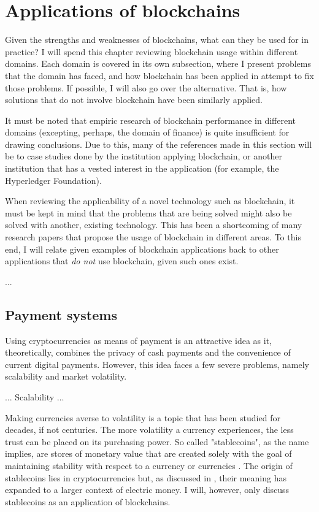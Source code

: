 \section{Applications of blockchains}

Given the strengths and weaknesses of blockchains, what can they be
used for in practice? I will spend this chapter reviewing blockchain
usage within different domains. Each domain is covered in its own
subsection, where I present problems that the domain has faced, and
how blockchain has been applied in attempt to fix those problems. If
possible, I will also go over the alternative. That is, how solutions
that do not involve blockchain have been similarly applied. 

It must be noted that empiric research of blockchain performance in
different domains (excepting, perhaps, the domain of finance) is quite
insufficient for drawing conclusions. Due to this, many of the
references made in this section will be to case studies done by the
institution applying blockchain, or another institution that has a
vested interest in the application (for example, the Hyperledger
Foundation).

When reviewing the applicability of a novel technology such as
blockchain, it must be kept in mind that the problems that are being
solved might also be solved with another, existing technology. This
has been a shortcoming of many research papers that propose the usage
of blockchain in different areas. To this end, I will relate given
examples of blockchain applications back to other applications that
\textit{do not} use blockchain, given such ones exist.

...

\subsection{Payment systems}

Using cryptocurrencies as means of payment is an attractive idea as
it, theoretically, combines the privacy of cash payments and the
convenience of current digital payments. However, this idea faces a
few severe problems, namely scalability and market volatility.

... Scalability ...

Making currencies averse to volatility is a topic that has been
studied for decades, if not centuries. The more volatility a currency
experiences, the less trust can be placed on its purchasing power. So
called "stablecoins", as the name implies, are stores of monetary
value that are created solely with the goal of maintaining stability
with respect to a currency or currencies \cite{liptonTether}. The
origin of stablecoins lies in cryptocurrencies but, as discussed in
\cite{liptonTether}, their meaning has expanded to a larger context of
electric money. I will, however, only discuss stablecoins as an
application of blockchains.


